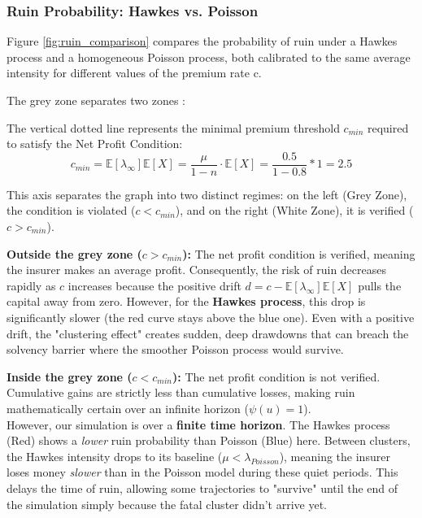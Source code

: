 \documentclass[a4paper,11pt]{article}
\begin{document}
\subsubsection*{Ruin Probability: Hawkes vs. Poisson}

Figure \ref{fig:ruin_comparison} compares the probability of ruin under a Hawkes process and a homogeneous Poisson process, both calibrated to the same average intensity for different values of the premium rate c. 

The grey zone separates two zones : 

The vertical dotted line represents the minimal premium threshold $c_{min}$ required to satisfy the Net Profit Condition:
$$ c_{min} = \mathbb{E}[\lambda_{\infty}] \mathbb{E}[X]  = \frac{\mu}{1-n} \cdot \mathbb{E}[X] = \frac{0.5}{1-0.8}*1 = 2.5 $$ 

This axis separates the graph into two distinct regimes: on the left (Grey Zone), the condition is violated ($c < c_{min}$), and on the right (White Zone), it is verified ($c > c_{min}$).

    \textbf{Outside the grey zone ($c > c_{min}$):}  
    The net profit condition is verified, meaning the insurer makes an average profit. Consequently, the risk of ruin decreases rapidly as $c$ increases because the positive drift $d = c - \mathbb{E}[\lambda_{\infty}] \mathbb{E}[X]$ pulls the capital away from zero.
    However, for the \textbf{Hawkes process}, this drop is significantly slower (the red curve stays above the blue one). Even with a positive drift, the "clustering effect" creates sudden, deep drawdowns that can breach the solvency barrier where the smoother Poisson process would survive.

    \textbf{Inside the grey zone ($c < c_{min}$):}  
    The net profit condition is not verified. Cumulative gains are strictly less than cumulative losses, making ruin mathematically certain over an infinite horizon ($\psi(u) = 1$).\\
    However, our simulation is over a \textbf{finite time horizon}. 
    The Hawkes process (Red) shows a \textit{lower} ruin probability than Poisson (Blue) here.
    Between clusters, the Hawkes intensity drops to its baseline ($\mu < \lambda_{Poisson}$), meaning the insurer loses money \textit{slower} than in the Poisson model during these quiet periods. This delays the time of ruin, allowing some trajectories to "survive" until the end of the simulation simply because the fatal cluster didn't arrive yet.
\end{document}
